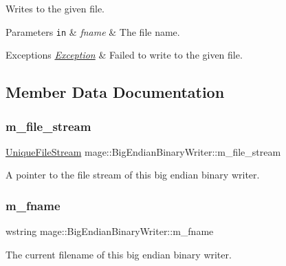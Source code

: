 Writes to the given file.


\begin{DoxyParams}[1]{Parameters}
\mbox{\tt in}  & {\em fname} & The file name. \\
\hline
\end{DoxyParams}

\begin{DoxyExceptions}{Exceptions}
{\em \mbox{\hyperlink{classmage_1_1_exception}{Exception}}} & Failed to write to the given file. \\
\hline
\end{DoxyExceptions}


\subsection{Member Data Documentation}
\mbox{\label{classmage_1_1_big_endian_binary_writer_ad2cdbdca429d6c351a57b51d175ffb55}} 
\subsubsection{\texorpdfstring{m\+\_\+file\+\_\+stream}{m\_file\_stream}}
{\footnotesize\ttfamily \mbox{\hyperlink{namespacemage_a0ee1bd45ad7dbb3dc8c8e1770e3538d4}{Unique\+File\+Stream}} mage\+::\+Big\+Endian\+Binary\+Writer\+::m\+\_\+file\+\_\+stream\hspace{0.3cm}{\ttfamily [private]}}

A pointer to the file stream of this big endian binary writer. \mbox{\label{classmage_1_1_big_endian_binary_writer_a5bf83b685bfce080f55458bdca2e698a}} 
\subsubsection{\texorpdfstring{m\+\_\+fname}{m\_fname}}
{\footnotesize\ttfamily wstring mage\+::\+Big\+Endian\+Binary\+Writer\+::m\+\_\+fname\hspace{0.3cm}{\ttfamily [private]}}

The current filename of this big endian binary writer. 